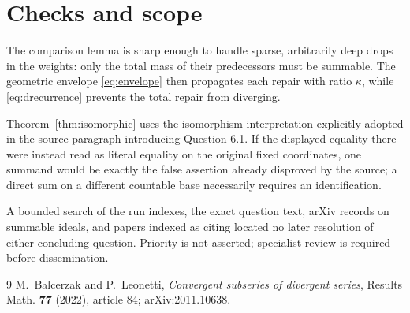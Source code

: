 \documentclass[11pt]{article}
\begin{document}
\section{Checks and scope}

The comparison lemma is sharp enough to handle sparse, arbitrarily deep
drops in the weights: only the total mass of their predecessors must be
summable.  The geometric envelope \eqref{eq:envelope} then propagates each
repair with ratio $\kappa$, while \eqref{eq:drecurrence} prevents the total
repair from diverging.

Theorem~\ref{thm:isomorphic} uses the isomorphism interpretation explicitly
adopted in the source paragraph introducing Question 6.1.  If the displayed
equality there were instead read as literal equality on the original fixed
coordinates, one summand would be exactly the false assertion already
disproved by the source; a direct sum on a different countable base necessarily
requires an identification.

A bounded search of the run indexes, the exact question text, arXiv records
on summable ideals, and papers indexed as citing \cite{BL} located no later
resolution of either concluding question.  Priority is not asserted;
specialist review is required before dissemination.

\begin{thebibliography}{9}
M.~Balcerzak and P.~Leonetti,
\emph{Convergent subseries of divergent series},
Results Math. \textbf{77} (2022), article 84;
arXiv:2011.10638.
\end{thebibliography}
\end{document}
